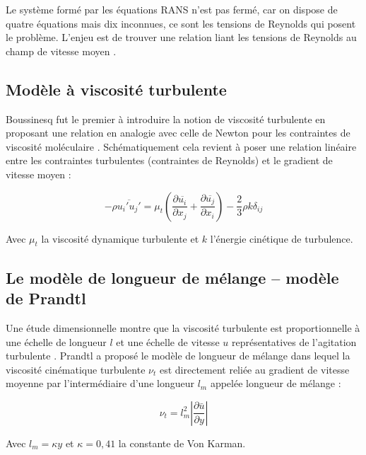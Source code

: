 Le système formé par les équations RANS n'est pas fermé, car on dispose de quatre équations mais dix inconnues, ce sont les tensions de Reynolds qui posent le problème. L'enjeu est de trouver une relation liant les tensions de Reynolds au champ de vitesse moyen \cite{launder1972lectures}.

\subsection{Modèle à viscosité turbulente}
\label{subsec:viscosite_turbulente}

Boussinesq fut le premier à introduire la notion de viscosité turbulente en proposant une relation en analogie avec celle de Newton pour les contraintes de viscosité moléculaire \cite{boussinesq1877essai}. Schématiquement cela revient à poser une relation linéaire entre les contraintes turbulentes (contraintes de Reynolds) et le gradient de vitesse moyen : \cite{schmitt2007boussinesq}

\begin{equation}
-\rho \overline{u_i' u_j'} = \mu_t \left( \frac{\partial \overline{u_i}}{\partial x_j} + \frac{\partial \overline{u_j}}{\partial x_i} \right) - \frac{2}{3} \rho k \delta_{ij}
\label{eq:boussinesq}
\end{equation}

Avec \( \mu_t \) la viscosité dynamique turbulente et \( k \) l'énergie cinétique de turbulence.

\subsection{Le modèle de longueur de mélange -- modèle de Prandtl}
\label{subsec:longueur_melange}

Une étude dimensionnelle montre que la viscosité turbulente est proportionnelle à une échelle de longueur $l$ et une échelle de vitesse $u$ représentatives de l'agitation turbulente \cite{prandtl1925bericht}. Prandtl a proposé le modèle de longueur de mélange dans lequel la viscosité cinématique turbulente \( \nu_t \) est directement reliée au gradient de vitesse moyenne par l'intermédiaire d'une longueur \( l_m \) appelée longueur de mélange : \cite{prandtl1945uber}

\begin{equation}
\nu_t = l_m^2 \left| \frac{\partial \bar{u}}{\partial y} \right|
\label{eq:longueur_melange}
\end{equation}

Avec \( l_m = \kappa y \) et \( \kappa = 0{,}41 \) la constante de Von Karman.

